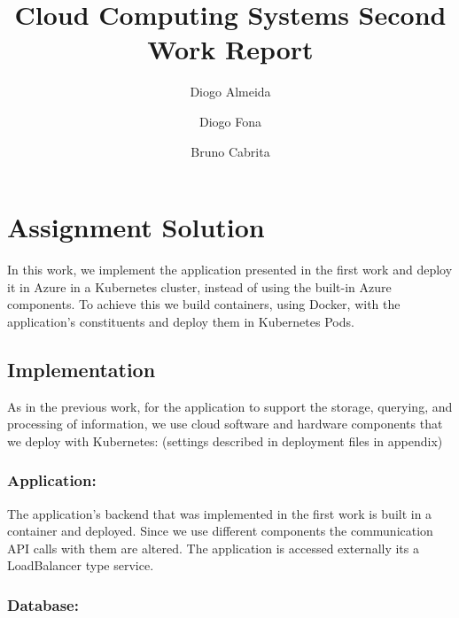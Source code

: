 \documentclass[runningheads]{llncs}
\begin{document}
%
\title{Cloud Computing Systems Second Work Report}
%
%
\author{Diogo Almeida \and
Diogo Fona \and
Bruno Cabrita}
%
%
%
\maketitle %
%
\section{Assignment Solution}

In this work, we implement the application presented in the first work and deploy it in Azure in a Kubernetes cluster, instead of using the built-in Azure components. To achieve this we build containers, using Docker, with the application's constituents and deploy them in Kubernetes Pods. 


\subsection{Implementation}

As in the previous work, for the application to support the storage, querying, and processing of information, we use cloud software and hardware components that we deploy with Kubernetes: (settings described in deployment files in appendix)

\subsubsection{Application:}

The application's backend that was implemented in the first work is built in a container and deployed. Since we use different components the communication API calls with them are altered. The application is accessed externally its a LoadBalancer type service.

\subsubsection{Database:}
\end{document}
